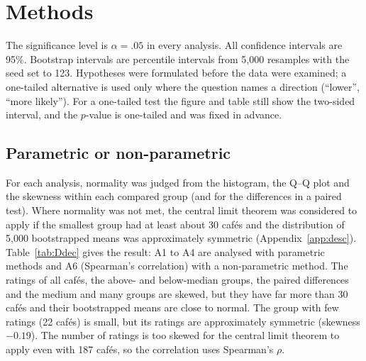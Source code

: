 \documentclass[11pt,a4paper]{article}
\newcommand{\intable}[3]{%
  \begingroup
  \def\tabcap{#2}\def\tablab{#3}%
  \renewenvironment{table}[1][]{\par\medskip\begin{lrbox}{\tabbox}}%
    {\end{lrbox}\par\centering
     \ifdim\wd\tabbox>\linewidth
       \resizebox{\linewidth}{!}{\usebox{\tabbox}}%
     \else
       \usebox{\tabbox}%
     \fi
     \par\captionof{table}{\tabcap}\label{\tablab}\medskip}%
  \endgroup}
\begin{document}
\section{Methods}
The significance level is $\alpha=.05$ in every analysis. All confidence intervals are 95\%. Bootstrap intervals are percentile intervals from 5,000 resamples with the seed set to 123. Hypotheses were formulated before the data were examined; a one-tailed alternative is used only where the question names a direction (``lower'', ``more likely''). For a one-tailed test the figure and table still show the two-sided interval, and the $p$-value is one-tailed and was fixed in advance.

\subsection{Parametric or non-parametric}
For each analysis, normality was judged from the histogram, the Q--Q plot and the skewness within each compared group (and for the differences in a paired test). Where normality was not met, the central limit theorem was considered to apply if the smallest group had at least about 30 caf\'es and the distribution of 5,000 bootstrapped means was approximately symmetric (Appendix~\ref{app:desc}). Table~\ref{tab:Ddec} gives the result: A1 to A4 are analysed with parametric methods and A6 (Spearman's correlation) with a non-parametric method. The ratings of all caf\'es, the above- and below-median groups, the paired differences and the medium and many groups are skewed, but they have far more than 30 caf\'es and their bootstrapped means are close to normal. The group with few ratings (22 caf\'es) is small, but its ratings are approximately symmetric (skewness $-0.19$). The number of ratings is too skewed for the central limit theorem to apply even with 187 caf\'es, so the correlation uses Spearman's $\rho$.

\intable{D_decisions_table.tex}{Method chosen for each analysis in the descriptive step (parametric or non-parametric).}{tab:Ddec}
\end{document}

